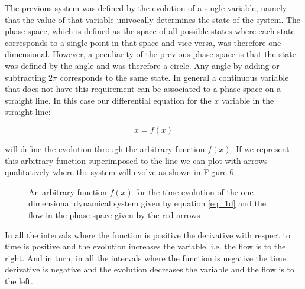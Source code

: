\documentclass{article}
\begin{document}
The previous system was defined by the evolution of a single variable, namely that the value of that variable univocally determines the state of the system.
The phase space, which is defined as the space of all possible states where each state corresponds to a single point in that space and vice versa, was therefore one-dimensional. 
However, a peculiarity of the previous phase space is that the state was defined by the angle and was therefore a circle. 
Any angle by adding or subtracting $2\pi$ corresponds to the same state. 
In general a continuous variable that does not have this requirement can be associated to a phase space on a straight line.
In this case our differential equation for the $x$ variable in the straight line:

\begin{equation}
    \dot x = f(x)
    \label{eq_1d}
\end{equation}

will define the evolution through the arbitrary function $f(x)$. 
If we represent this arbitrary function superimposed to the line we can plot with arrows qualitatively where the system will evolve as shown in Figure 6.

\begin{figure}
    \centering
    \caption{An arbitrary function $f(x)$ for the time evolution of the one-dimensional dynamical system given by equation \ref{eq_1d} and the flow in the phase space given by the red arrows} 
    \label{fig_onedimension}
\end{figure}

In all the intervals where the function is positive the derivative with respect to time is positive and the evolution increases the variable, i.e. the flow is to the right. 
And in turn, in all the intervals where the function is negative the time derivative is negative and the evolution decreases the variable and the flow is to the left.
\end{document}
